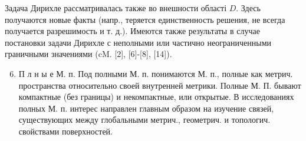 \documentclass[10pt]{article}
\begin{document}
Задача Дирихле рассматривалась также во внешности області $D$. Здесь получаются новые факты (напр., теряется единственность решения, не всегда получается разрешимость и т. д.). Имеются также результаты в случае постановки задачи Дирихле с неполными или частично неограниченными граничными значениями (cM. [2], [6]-[8], [14]).



\begin{enumerate}

  \setcounter{enumi}{5}

  \item П л н ы е М. п. Под полными М. п. понимаются М. п., полные как метрич. пространства относительно своей внутренней метрики. Полные М. П. бывают компактные (без границы) и некомпактные, или открытые. В исследованиях полных М. п. интерес направлен главным образом на изучение связей, существующих между глобальными метрич., геометрич. и топологич. свойствами поверхностей.

\end{enumerate}
\end{document}
